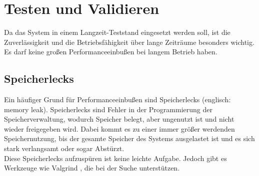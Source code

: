 
\chapter{Testen und Validieren}
\label{chapter_Testen_und_Validieren}

Da das System in einem Langzeit-Teststand eingesetzt werden soll, ist die Zuverlässigkeit und die Betriebsfähigkeit über lange Zeiträume besonders wichtig. Es darf keine großen Performanceeinbußen bei langem Betrieb haben.

\section{Speicherlecks}

Ein häufiger Grund für Performanceeinbußen sind Speicherlecks (englisch: memory leak). Speicherlecks sind Fehler in der Programmierung der Speicherverwaltung, wodurch Speicher belegt, aber ungenutzt ist und nicht wieder freigegeben wird. Dabei kommt es zu einer immer größer werdenden Speichernutzung, bis der gesamte Speicher des Systems ausgelastet ist und es sich stark verlangsamt oder sogar Abstürzt.\\
Diese Speicherlecks aufzuspüren ist keine leichte Aufgabe. Jedoch gibt es Werkzeuge wie Valgrind \cite{valgrind}, die bei der Suche unterstützen.\\
